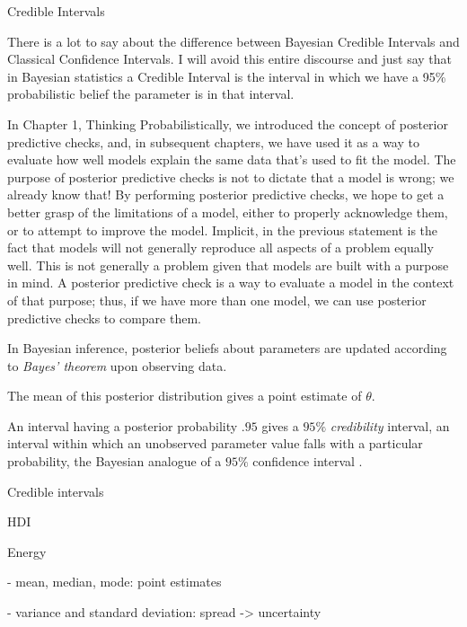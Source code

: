 Credible Intervals

There is a lot to say about the difference between Bayesian Credible Intervals and Classical Confidence Intervals. I will avoid this entire discourse and just say that in Bayesian statistics a Credible Interval is the interval in which we have a 95\% probabilistic belief the parameter is in that interval.

In Chapter 1, Thinking Probabilistically, we introduced the concept of posterior predictive checks, and, in subsequent chapters, we have used it as a way to evaluate how well models explain the same data that's used to fit the model. The purpose of posterior predictive checks is not to dictate that a model is wrong; we already know that! By performing posterior predictive checks, we hope to get a better grasp of the limitations of a model, either to properly acknowledge them, or to attempt to improve the model. Implicit, in the previous statement is the fact that models will not generally reproduce all aspects of a problem equally well. This is not generally a problem given that models are built with a purpose in mind. A posterior predictive check is a way to evaluate a model in the context of that purpose; thus, if we have more than one model, we can use posterior predictive checks to compare them.


In Bayesian inference, posterior beliefs about parameters are updated according to \textit{Bayes' theorem} upon observing data.  

The mean of this posterior distribution gives a point estimate of $\theta$. 

An interval having a posterior probability $.95$ gives a $95\%$ \textit{credibility} interval, an interval within which an unobserved parameter value falls with a particular probability, the Bayesian analogue of a $95\%$ confidence interval \cite[p. 777]{STK}.

Credible intervals 

HDI 

Energy

- mean, median, mode: point estimates

- variance and standard deviation: spread -> uncertainty 


